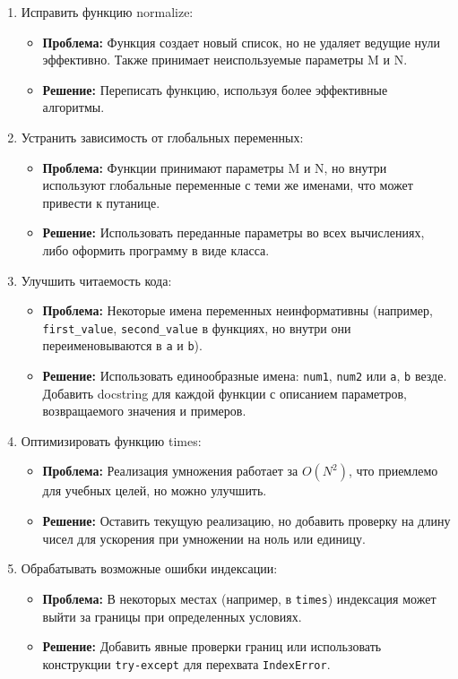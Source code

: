 \documentclass{article}[14pt]
\begin{document}
\begin{enumerate}
\item Исправить функцию normalize:
\begin{itemize}
    \item \textbf{Проблема:} Функция создает новый список, но не удаляет ведущие нули эффективно. Также принимает неиспользуемые параметры M и N.
    \item \textbf{Решение:} Переписать функцию, используя более эффективные алгоритмы.
\end{itemize}

\item Устранить зависимость от глобальных переменных:
\begin{itemize}
    \item \textbf{Проблема:} Функции принимают параметры M и N, но внутри используют глобальные переменные с теми же именами, что может привести к путанице.
    \item \textbf{Решение:} Использовать переданные параметры во всех вычислениях, либо оформить программу в виде класса.
\end{itemize}

\item Улучшить читаемость кода:
\begin{itemize}
    \item \textbf{Проблема:} Некоторые имена переменных неинформативны (например, \texttt{first\_value}, \texttt{second\_value} в функциях, но внутри они переименовываются в \texttt{a} и \texttt{b}).
    \item \textbf{Решение:} Использовать единообразные имена: \texttt{num1}, \texttt{num2} или \texttt{a}, \texttt{b} везде. Добавить docstring для каждой функции с описанием параметров, возвращаемого значения и примеров.
\end{itemize}

\item Оптимизировать функцию times:
\begin{itemize}
    \item \textbf{Проблема:} Реализация умножения работает за $O(N^2)$, что приемлемо для учебных целей, но можно улучшить.
    \item \textbf{Решение:} Оставить текущую реализацию, но добавить проверку на длину чисел для ускорения при умножении на ноль или единицу.
\end{itemize}

\item Обрабатывать возможные ошибки индексации:
\begin{itemize}
    \item \textbf{Проблема:} В некоторых местах (например, в \texttt{times}) индексация может выйти за границы при определенных условиях.
    \item \textbf{Решение:} Добавить явные проверки границ или использовать конструкции \texttt{try-except} для перехвата \texttt{IndexError}.
\end{itemize}

\end{enumerate}
\end{document}
